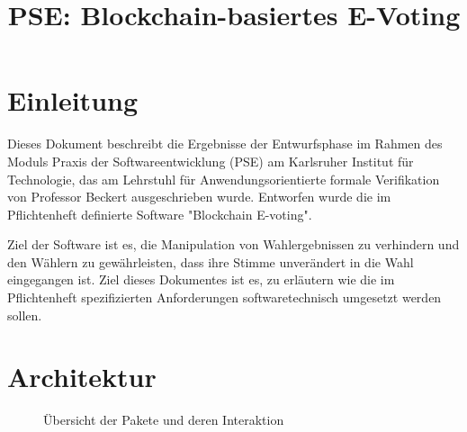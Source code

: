 \documentclass[parskip=full]{scrartcl}
\title{PSE: Blockchain-basiertes E-Voting}
\begin{document}
	\clearpage
	\maketitle
	\newpage
	
	\tableofcontents
	\newpage
	\section{Einleitung}
	Dieses Dokument beschreibt die Ergebnisse der Entwurfsphase im Rahmen des Moduls Praxis der Softwareentwicklung (PSE) am Karlsruher Institut für Technologie, das am Lehrstuhl für Anwendungsorientierte formale Verifikation von Professor Beckert ausgeschrieben wurde.
	Entworfen wurde die im Pflichtenheft definierte Software "Blockchain E-voting". 
	
	Ziel der Software ist es, die Manipulation
	von Wahlergebnissen zu verhindern und den Wählern zu gewährleisten, dass ihre Stimme unverändert in die Wahl eingegangen ist.
	Ziel dieses Dokumentes ist es, zu erläutern wie die im Pflichtenheft spezifizierten Anforderungen softwaretechnisch umgesetzt werden sollen.
	
	\section{Architektur}
	\begin{figure}[!h]
	\centering
	
	\caption{Übersicht der Pakete und deren Interaktion}
	\end{figure}
\end{document}
